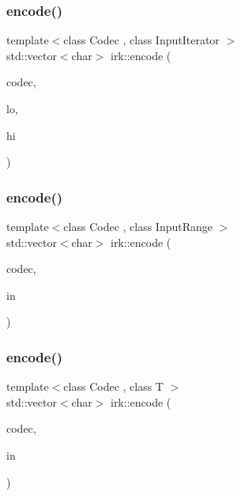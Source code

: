 \mbox{\label{namespaceirk_abb9d919900c25d5bd3ffc5c25343fc96}} 
\subsubsection{\texorpdfstring{encode()}{encode()}\hspace{0.1cm}{\footnotesize\ttfamily [1/3]}}
{\footnotesize\ttfamily template$<$class Codec , class Input\+Iterator $>$ \\
std\+::vector$<$char$>$ irk\+::encode (\begin{DoxyParamCaption}\item[{const Codec \&}]{codec,  }\item[{Input\+Iterator}]{lo,  }\item[{Input\+Iterator}]{hi }\end{DoxyParamCaption})}

\mbox{\label{namespaceirk_a59d242b9679dbc0d8fe61f1b72a7d5a2}} 
\subsubsection{\texorpdfstring{encode()}{encode()}\hspace{0.1cm}{\footnotesize\ttfamily [2/3]}}
{\footnotesize\ttfamily template$<$class Codec , class Input\+Range $>$ \\
std\+::vector$<$char$>$ irk\+::encode (\begin{DoxyParamCaption}\item[{const Codec \&}]{codec,  }\item[{Input\+Range}]{in }\end{DoxyParamCaption})}

\mbox{\label{namespaceirk_a22868b0491ea12fc4716da3970addc14}} 
\subsubsection{\texorpdfstring{encode()}{encode()}\hspace{0.1cm}{\footnotesize\ttfamily [3/3]}}
{\footnotesize\ttfamily template$<$class Codec , class T $>$ \\
std\+::vector$<$char$>$ irk\+::encode (\begin{DoxyParamCaption}\item[{const Codec \&}]{codec,  }\item[{std\+::initializer\+\_\+list$<$ T $>$}]{in }\end{DoxyParamCaption})}

